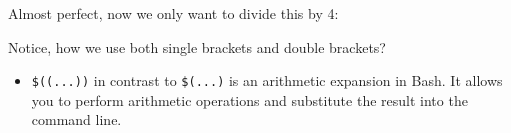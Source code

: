 \documentclass[
  letterpaper,
  DIV=11,
  numbers=noendperiod]{scrreprt}
\newenvironment{Shaded}{}{}
\newcommand{\AttributeTok}[1]{\textcolor[rgb]{0.84,0.23,0.29}{#1}}
\newcommand{\BuiltInTok}[1]{\textcolor[rgb]{0.84,0.23,0.29}{#1}}
\newcommand{\ControlFlowTok}[1]{\textcolor[rgb]{0.84,0.23,0.29}{#1}}
\newcommand{\DecValTok}[1]{\textcolor[rgb]{0.00,0.36,0.77}{#1}}
\newcommand{\FunctionTok}[1]{\textcolor[rgb]{0.44,0.26,0.76}{#1}}
\newcommand{\KeywordTok}[1]{\textcolor[rgb]{0.84,0.23,0.29}{#1}}
\newcommand{\NormalTok}[1]{\textcolor[rgb]{0.14,0.16,0.18}{#1}}
\newcommand{\OperatorTok}[1]{\textcolor[rgb]{0.14,0.16,0.18}{#1}}
\newcommand{\PreprocessorTok}[1]{\textcolor[rgb]{0.84,0.23,0.29}{#1}}
\newcommand{\StringTok}[1]{\textcolor[rgb]{0.01,0.18,0.38}{#1}}
\newcommand{\VariableTok}[1]{\textcolor[rgb]{0.89,0.38,0.04}{#1}}
\providecommand{\tightlist}{%
  \setlength{\itemsep}{0pt}\setlength{\parskip}{0pt}}\usepackage{longtable,booktabs,array}
\begin{document}
\begin{tcolorbox}
Almost perfect, now we only want to divide this by 4:

\begin{Shaded}
\end{Shaded}

Notice, how we use both single brackets and double brackets?

\begin{itemize}
\tightlist
\item
  \texttt{\$((...))} in contrast to \texttt{\$(...)} is an arithmetic
  expansion in Bash. It allows you to perform arithmetic operations and
  substitute the result into the command line.
\end{itemize}

\end{tcolorbox}
\end{document}
